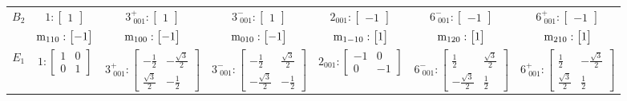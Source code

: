 \documentclass[fleqn,8pt,landscape]{jsarticle}
\begin{document}
\begin{longtable}{ccccccc}
$ B_{2} $ & $ 1:\begin{bmatrix} 1 \end{bmatrix} $ & $ 3^{+}_{\,\,001}:\begin{bmatrix} 1 \end{bmatrix} $ & $ 3^{-}_{\,\,001}:\begin{bmatrix} 1 \end{bmatrix} $ & $ 2{}_{001}:\begin{bmatrix} -1 \end{bmatrix} $ & $ 6^{-}_{\,\,001}:\begin{bmatrix} -1 \end{bmatrix} $ & $ 6^{+}_{\,\,001}:\begin{bmatrix} -1 \end{bmatrix} $ \\
& $ {\rm m}_{110}:\begin{bmatrix} -1 \end{bmatrix} $ & $ {\rm m}_{100}:\begin{bmatrix} -1 \end{bmatrix} $ & $ {\rm m}_{010}:\begin{bmatrix} -1 \end{bmatrix} $ & $ {\rm m}_{1-10}:\begin{bmatrix} 1 \end{bmatrix} $ & $ {\rm m}_{120}:\begin{bmatrix} 1 \end{bmatrix} $ & $ {\rm m}_{210}:\begin{bmatrix} 1 \end{bmatrix} $ \\ \hline
$ E_{1} $ & $ 1:\begin{bmatrix} 1 & 0 \\ 0 & 1 \end{bmatrix} $ & $ 3^{+}_{\,\,001}:\begin{bmatrix} - \frac{1}{2} & - \frac{\sqrt{3}}{2} \\ \frac{\sqrt{3}}{2} & - \frac{1}{2} \end{bmatrix} $ & $ 3^{-}_{\,\,001}:\begin{bmatrix} - \frac{1}{2} & \frac{\sqrt{3}}{2} \\ - \frac{\sqrt{3}}{2} & - \frac{1}{2} \end{bmatrix} $ & $ 2{}_{001}:\begin{bmatrix} -1 & 0 \\ 0 & -1 \end{bmatrix} $ & $ 6^{-}_{\,\,001}:\begin{bmatrix} \frac{1}{2} & \frac{\sqrt{3}}{2} \\ - \frac{\sqrt{3}}{2} & \frac{1}{2} \end{bmatrix} $ & $ 6^{+}_{\,\,001}:\begin{bmatrix} \frac{1}{2} & - \frac{\sqrt{3}}{2} \\ \frac{\sqrt{3}}{2} & \frac{1}{2} \end{bmatrix} $ \\

\end{longtable}
\end{document}
